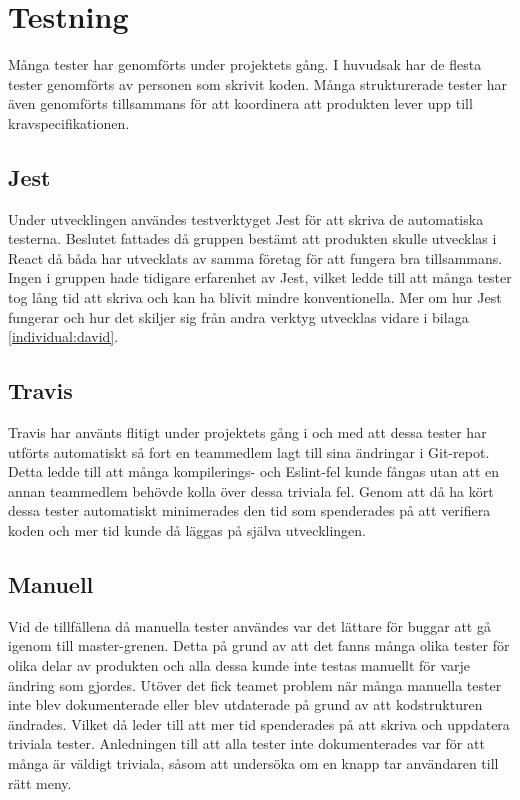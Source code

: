 \pagebreak

\section{Testning}
Många tester har genomförts under projektets gång. I huvudsak har de flesta tester genomförts av personen som skrivit koden. Många strukturerade tester har även genomförts tillsammans för att koordinera att produkten lever upp till kravspecifikationen.

\subsection{Jest}
Under utvecklingen användes testverktyget Jest för att skriva de automatiska testerna. Beslutet fattades då gruppen bestämt att produkten skulle utvecklas i React då båda har utvecklats av samma företag för att fungera bra tillsammans. Ingen i gruppen hade tidigare erfarenhet av Jest, vilket ledde till att många tester tog lång tid att skriva och kan ha blivit mindre konventionella. Mer om hur Jest fungerar och hur det skiljer sig från andra verktyg utvecklas vidare i bilaga \ref{individual:david}.

\subsection{Travis}
Travis har använts flitigt under projektets gång i och med att dessa tester har utförts automatiskt så fort en teammedlem lagt till sina ändringar i Git-repot. Detta ledde till att många kompilerings- och Eslint-fel kunde fångas utan att en annan teammedlem behövde kolla över dessa triviala fel. Genom att då ha kört dessa tester automatiskt minimerades den tid som spenderades på att verifiera koden och mer tid kunde då läggas på själva utvecklingen.

\subsection{Manuell}
Vid de tillfällena då manuella tester användes var det lättare för buggar att gå igenom till master-grenen. Detta på grund av att det fanns många olika tester för olika delar av produkten och alla dessa kunde inte testas manuellt för varje ändring som gjordes. Utöver det fick teamet problem när många manuella tester inte blev dokumenterade eller blev utdaterade på grund av att kodstrukturen ändrades. Vilket då leder till att mer tid spenderades på att skriva och uppdatera triviala tester. Anledningen till att alla tester inte dokumenterades var för att många är väldigt triviala, såsom att undersöka om en knapp tar användaren till rätt meny.
